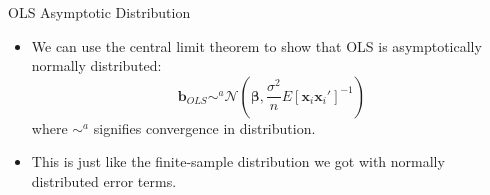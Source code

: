 \begin{frame}{OLS Asymptotic Distribution}
\begin{itemize}
	\item We can use the central limit theorem to show that OLS is asymptotically
	normally distributed:\[
\boldsymbol{b}_{OLS}\sim^{a}\mathcal{N}\left(\boldsymbol{\beta},\frac{\sigma^{2}}{n}E\left[\boldsymbol{x}_{i}\boldsymbol{x}_{i}'\right]^{-1}\right)
\]
	where $ \sim^{a}$ signifies convergence in distribution. 

	\item This is just like the finite-sample distribution
	we got with normally distributed error terms. 
\end{itemize}
\end{frame}






